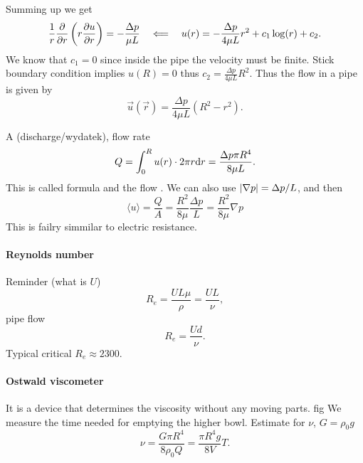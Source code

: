 \documentclass[../main.tex]{subfiles}
\begin{document}
    Summing up we get
    \begin{displaymath}
      \frac{1}{r} \frac{\partial }{\partial r} \left( r \frac{\partial u}{\partial r} \right) = - \frac{\Delta p}{\mu L} \quad \Longleftarrow \quad u(r) = - \frac{\Delta p}{4\mu L}r^2 + c_1 \log(r) + c_2.
    \end{displaymath}
    We know that $c_1 = 0$ since inside the pipe the velocity must be finite.
    Stick boundary condition implies $u(R) = 0$ thus $c_2 = \frac{\Delta p}{4 \mu L} R^2$.
    Thus the flow in a pipe is given by
    \begin{displaymath}
      \vec u (\vec r) = \frac{\Delta p}{4 \mu L} (R^2 - r^2).
    \end{displaymath}
    
    A  (discharge/wydatek), flow rate
    \begin{displaymath}
      Q = \int_0^R u(r) \cdot  2 \pi r \mathrm{d} r = \frac{\Delta p \pi R^4}{8 \mu L}.
    \end{displaymath}
    This is called  formula and the flow .
    We can also use $\left| \nabla p\right| = \Delta p / L$, and then
    \begin{displaymath}
      \langle u \rangle = \frac{Q}{A} = \frac{R^2}{8 \mu} \frac{\Delta p}{L} = \frac{R^2}{8 \mu} \nabla p
    \end{displaymath}
    This is failry simmilar to electric resistance.

    \paragraph{Reynolds number}
    Reminder (\todo what is $U$)
    \begin{displaymath}
      R_e = \frac{UL \mu}{\rho} = \frac{U L }{\nu},
    \end{displaymath}
    pipe flow
    \begin{displaymath}
      R_e = \frac{Ud}{\nu}.
    \end{displaymath}
    Typical critical $R_e\approx 2300$.
    
    
    \paragraph{Ostwald viscometer}
    It is a device that determines the viscosity without any moving parts. \todo fig
    We measure the time needed for emptying the higher bowl.
    Estimate for $\nu$, $G = \rho_0 g$
    \begin{displaymath}
      \nu = \frac{G\pi R^4}{8 \rho_0 Q} = \frac{\pi R^4 g}{8 V} T.
    \end{displaymath}
    
\end{document}
